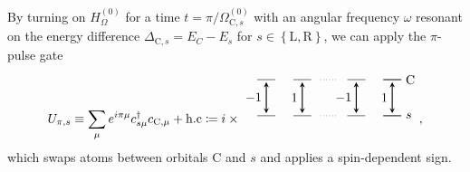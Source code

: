 \documentclass[aps,nofootinbib,notitlepage,11pt]{revtex4-1}
\renewcommand{\t}{\text} %
\renewcommand{\set}[1]{\left\{#1\right\}} %
\renewcommand{\L}{\text{L}}
\newcommand{\C}{\text{C}}
\newcommand{\R}{\text{R}}
\newcommand{\1}{\mathds{1}}
\begin{document}
By turning on $H_\Omega^{(0)}$ for a time $t=\pi/\Omega^{(0)}_{\C,s}$
with an angular frequency $\omega$ resonant on the energy difference
$\Delta_{\C,s}=E_C-E_s$ for $s\in\set{\L,\R}$, we can apply the
$\pi$-pulse gate
\begin{align}
  U_{\pi,s}
  \equiv \sum_\mu e^{i\pi\mu} c_{s\mu}^\dag c_{\C,\mu} + \t{h.c}
  \coloneqq i \times
  \begin{tikzpicture}[
    scale=0.5,
    trans/.style={thick,<->,shorten >=2pt,shorten <=2pt,>=stealth}
    ]
    \draw (0,0) -- (1,0);
    \draw (2,0) -- (3,0);
    \draw[dotted] (3.5,0) -- (4.5,0);
    \draw (5,0) -- (6,0);
    \draw (7,0) -- (8,0);
    \draw (7,0) -- (8,0) node[right] {$\C$};
    \draw (0,-2) -- (1,-2);
    \draw (2,-2) -- (3,-2);
    \draw[dotted] (3.5,-2) -- (4.5,-2);
    \draw (5,-2) -- (6,-2);
    \draw (7,-2) -- (8,-2);
    \draw (7,-2) -- (8,-2) node[right] {$s$};
    \draw[trans] (0.5,0) -- (0.5,-2) node[midway,left] {$-1$};
    \draw[trans] (2.5,0) -- (2.5,-2) node[midway,left] {$1$};
    \draw[trans] (5.5,0) -- (5.5,-2) node[midway,left] {$-1$};
    \draw[trans] (7.5,0) -- (7.5,-2) node[midway,left] {$1$};
  \end{tikzpicture},
  \label{eq:U_pi}
\end{align}
which swaps atoms between orbitals $\C$ and $s$ and applies a
spin-dependent sign.
\end{document}
